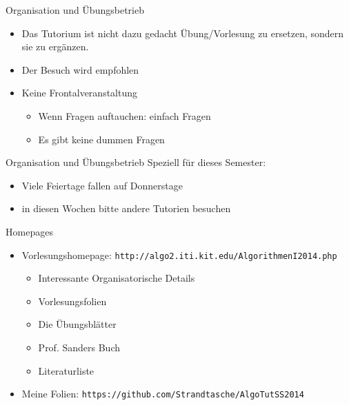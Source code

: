 \documentclass[18pt]{beamer}
\begin{document}
	\begin{frame}{Organisation und Übungsbetrieb}
		\begin{itemize}
			\item Das Tutorium ist nicht dazu gedacht Übung/Vorlesung zu ersetzen, sondern sie zu ergänzen.
			\item Der Besuch wird empfohlen
			\item Keine Frontalveranstaltung
			\begin{itemize}
				\item Wenn Fragen auftauchen: einfach Fragen
				\item Es gibt keine dummen Fragen
			\end{itemize}
		\end{itemize}
	\end{frame}

	\begin{frame}{Organisation und Übungsbetrieb}
		Speziell für dieses Semester:
		\begin{itemize}
			\item Viele Feiertage fallen auf Donnerstage
			\item in diesen Wochen bitte andere Tutorien besuchen 
		\end{itemize}		
	\end{frame}

	\begin{frame}{Homepages}
		\begin{itemize}
			\item Vorlesungshomepage: \texttt{http://algo2.iti.kit.edu/AlgorithmenI2014.php}
			\begin{itemize}
				\item Interessante Organisatorische Details
				\item Vorlesungsfolien
				\item Die Übungsblätter
				\item Prof. Sanders Buch
				\item Literaturliste
			\end{itemize}
			\item Meine Folien: \texttt{https://github.com/Strandtasche/AlgoTutSS2014}
			
		\end{itemize}		
	\end{frame}
\end{document}
